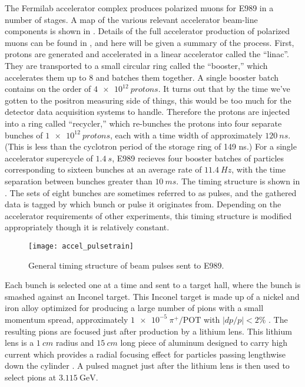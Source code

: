 The Fermilab accelerator complex produces polarized muons for E989 in a number of stages. A map of the various relevant accelerator beam-line components is shown in . Details of the full accelerator production of polarized muons can be found in , and here will be given a summary of the process. First, protons are generated and accelerated in a linear accelerator called the ``linac''. They are transported to a small circular ring called the ``booster,'' which accelerates them up to 8 \GeV and batches them together. A single booster batch contains on the order of $\SI{4e12}{protons}$. It turns out that by the time we've gotten to the positron measuring side of things, this would be too much for the detector data acquisition systems to handle. Therefore the protons are injected into a ring called ``recycler,'' which re-bunches the protons into four separate bunches of $\SI{1e12}{protons}$, each with a time width of approximately $\SI{120}{ns}$. (This is less than the cyclotron period of the storage ring of 149 ns.) For a single accelerator supercycle of $\SI{1.4}{s}$, E989 recieves four booster batches of particles corresponding to sixteen bunches at an average rate of $\SI{11.4}{Hz}$,  with the time separation between bunches greater than $\SI{10}{ms}$. The timing structure is shown in . The sets of eight bunches are sometimes referred to as pulses, and the gathered data is tagged by which bunch or pulse it originates from. Depending on the accelerator requirements of other experiments, this timing structure is modified appropriately though it is relatively constant.

\begin{figure}[]
    \centering
    \texttt{[image: accel\_pulsetrain]}
    \caption[Fermilab accelerator pulse train]{General timing structure of beam pulses sent to E989.}   
    \label{fig:pulsetrain}
\end{figure}


Each bunch is selected one at a time and sent to a target hall, where the bunch is smashed against an Inconel target. This Inconel target is made up of a nickel and iron alloy optimized for producing a large number of pions with a small momentum spread, approximately $\SI{1e-5}{\pi^{+}/\text{POT}}$ with $|dp/p| < 2 \%$ \cite{Stratakis:2017uci}. The resulting pions are focused just after production by a lithium lens. This lithium lens is a $\SI{1}{cm}$ radius and $\SI{15}{cm}$ long piece of aluminum designed to carry high current which provides a radial focusing effect for particles passing lengthwise down the cylinder \cite{LiLens}. A pulsed magnet just after the lithium lens is then used to select pions at $\SI{3.115}{\GeV}$.

